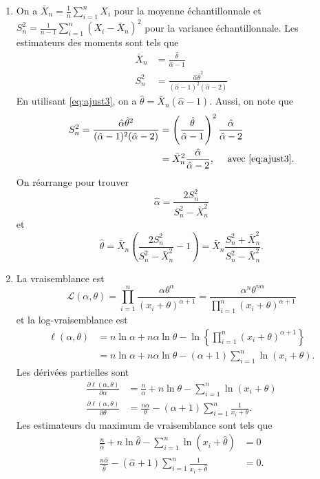 \begin{solution}{4.12}
\begin{enumerate}
\item On a $\bar X_n=\frac{1}{n}\sum_{i=1}^nX_i$ pour la moyenne échantillonnale et $S_n^2=\frac{1}{n-1}\sum_{i=1}^n(X_i-\bar X_n)^2$ pour la variance échantillonnale. Les estimateurs des moments sont tels que
\begin{align}
\bar X_n &= \frac{\hat\theta}{\hat\alpha-1} \label{eq:ajust3}\\
S_n^2 &= \frac{\hat\alpha\hat\theta^2}{(\hat\alpha-1)^2(\hat\alpha-2)}\label{eq:ajust4}
\end{align}
En utilisant \eqref{eq:ajust3}, on a $\hat\theta=\bar X_n (\hat\alpha -1)$. Aussi, on note que
\begin{align*}
S_n^2= \frac{\hat\alpha\hat\theta^2}{(\hat\alpha-1)^2(\hat\alpha-2)}&= \left(\frac{\hat\theta}{\hat\alpha-1}\right)^2\frac{\hat\alpha}{\hat\alpha-2}\\
& = \bar X_n^2\frac{\hat\alpha}{\hat\alpha-2}, \quad \mbox{ avec \eqref{eq:ajust3}}.
\end{align*}
On réarrange pour trouver
$$
\hat\alpha = \frac{2S_n^2}{S_n^2-\bar X_n^2}
$$
et
$$
\hat\theta=\bar X_n \left(\frac{2S_n^2}{S_n^2-\bar X_n^2} -1\right)=\bar X_n \frac{S_n^2+\bar X_n^2}{S_n^2-\bar X_n^2}.
$$

\item La vraisemblance est
$$
\mathcal{L}(\alpha,\theta)=\prod_{i=1}^n\frac{\alpha\theta^\alpha}{(x_i+\theta)^{\alpha+1}}=\frac{\alpha^n\theta^{n\alpha}}{\prod_{i=1}^n(x_i+\theta)^{\alpha+1}}
$$
et la log-vraisemblance est
\begin{align*}
\ell(\alpha,\theta)&=n\ln \alpha+n\alpha\ln \theta-\ln\left\{\prod_{i=1}^n(x_i+\theta)^{\alpha+1}\right\}\\
&=n\ln \alpha+n\alpha\ln \theta-(\alpha+1)\sum_{i=1}^n\ln(x_i+\theta).
\end{align*}
Les dérivées partielles sont
\begin{align*}
\frac{\partial\ell(\alpha,\theta)}{\partial \alpha}&=\frac{n}{ \alpha}+n\ln \theta-\sum_{i=1}^n\ln(x_i+\theta)\\
\frac{\partial\ell(\alpha,\theta)}{\partial \theta}&=\frac{n\alpha}{ \theta}-(\alpha+1)\sum_{i=1}^n\frac{1}{x_i+\theta}.
\end{align*}
Les estimateurs du maximum de vraisemblance sont tels que
\begin{align*}
\frac{n}{\hat\alpha}+n\ln \hat\theta-\sum_{i=1}^n\ln(x_i+\hat\theta)&=0\\
\frac{n\hat\alpha}{ \hat\theta}-(\hat\alpha+1)\sum_{i=1}^n\frac{1}{x_i+\hat\theta}&=0.
\end{align*}
\end{enumerate}
\end{solution}
